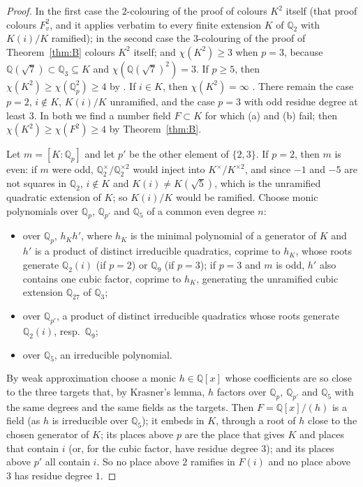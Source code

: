 \documentclass[11pt,a4paper]{amsart}
\theoremstyle{remark}
\newcommand{\Q}{\mathbb{Q}}
\begin{document}
\begin{proof}
In the first case the $2$-colouring of the proof of \cite[Proposition~3]{TC} colours $K^2$ itself (that proof
colours $F_v^2$, and it applies verbatim to every finite extension $K$ of $\Q_2$ with $K(i)/K$ ramified); in the
second case the $3$-colouring of the proof of Theorem~\ref{thm:B} colours $K^2$ itself; and
$\chi(K^2)\ge3$ when $p=3$, because $\Q(\sqrt7)\subset\Q_3\subseteq K$ and $\chi(\Q(\sqrt7)^2)=3$. If $p\ge5$, then
$\chi(K^2)\ge\chi(\Q_p^2)\ge4$ by \cite[Corollary~3]{FC}. If $i\in K$, then $\chi(K^2)=\infty$ \cite[Proposition~3]{PP}.
There remain the case $p=2$, $i\notin K$, $K(i)/K$ unramified, and the case $p=3$ with odd residue degree at least
$3$. In both we find a number field $F\subset K$ for which (a) and (b) fail; then $\chi(K^2)\ge\chi(F^2)\ge4$ by
Theorem~\ref{thm:B}.

Let $m=[K:\Q_p]$ and let $p'$ be the other element of $\{2,3\}$. If $p=2$, then $m$ is even: if $m$ were odd,
$\Q_2^\times/\Q_2^{\times2}$ would inject into $K^\times/K^{\times2}$, and since $-1$ and $-5$ are not squares in
$\Q_2$, $i\notin K$ and $K(i)\ne K(\sqrt5)$, which is the unramified quadratic extension of $K$; so $K(i)/K$ would be
ramified. Choose monic polynomials over $\Q_p$, $\Q_{p'}$ and $\Q_5$ of a common even degree $n$:
\begin{itemize}
\item over $\Q_p$, $h_Kh'$, where $h_K$ is the minimal polynomial of a generator of $K$ and $h'$ is a product of
distinct irreducible quadratics, coprime to $h_K$, whose roots generate $\Q_2(i)$ (if $p=2$) or $\Q_9$ (if $p=3$);
if $p=3$ and $m$ is odd, $h'$ also contains one cubic factor, coprime to $h_K$, generating the unramified cubic
extension $\Q_{27}$ of $\Q_3$;
\item over $\Q_{p'}$, a product of distinct irreducible quadratics whose roots generate $\Q_2(i)$, resp.\ $\Q_9$;
\item over $\Q_5$, an irreducible polynomial.
\end{itemize}
By weak approximation choose a monic $h\in\Q[x]$ whose coefficients are so close to the three targets that, by
Krasner's lemma, $h$ factors over $\Q_p$, $\Q_{p'}$ and $\Q_5$ with the same degrees and the same fields as the
targets. Then $F=\Q[x]/(h)$ is a field (as $h$ is irreducible over $\Q_5$); it embeds in $K$, through a root of
$h$ close to the chosen generator of $K$; its places above $p$ are the place that gives $K$ and places that contain
$i$ (or, for the cubic factor, have residue degree $3$); and its places above $p'$ all contain $i$. So no place
above $2$ ramifies in $F(i)$ and no place above $3$ has residue degree $1$.
\end{proof}
\end{document}
